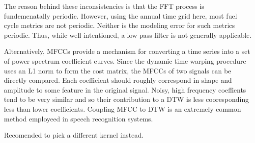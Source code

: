 The reason behind these inconsistencies is that the FFT process is fundemenatally 
periodic.  However, using the annual time grid here, most fuel cycle metrics 
are not periodic. Neither is the modeling error for such metrics periodic. 
Thus, while well-intentioned, a low-pass filter is not generally applicable.

Alternatively, MFCCs provide a mechanism for converting a time series into a 
set of power spectrum coefficient curves. Since the dynamic time warping procedure
uses an L1 norm to form the cost matrix, the MFCCs of two signals can be directly 
compared. Each coefficient should roughly correspond in shape and amplitude to some
feature in the original signal.  Noisy, high frequency coeffients tend to be 
very similar and so their contribution to a DTW is less cooresponding less than 
lower coefficients. Coupling MFCC to DTW is an extremely common method employeed in 
speech recognition systems.  


Recomended to pick a different kernel instead.